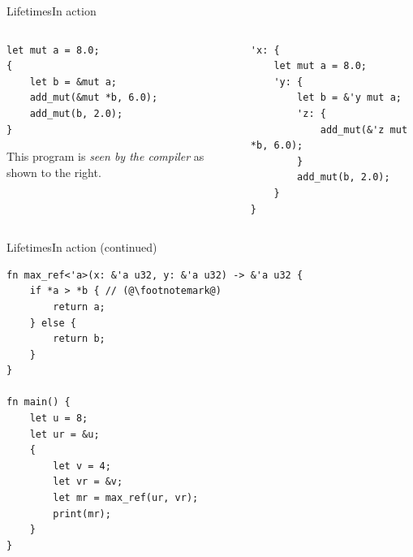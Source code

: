 \documentclass[xcolor=x11names,compress]{beamer}
\renewcommand{\(}{\begin{columns}}
\renewcommand{\)}{\end{columns}}
\newcommand{\<}[1]{\begin{column}{#1}}
\renewcommand{\>}{\end{column}}
\begin{document}
\begin{frame}[fragile]{Lifetimes}{In action}
\begin{columns}[T]
\begin{column}{.40\textwidth}
\begin{lstlisting}[basicstyle=\footnotesize\ttfamily,numbers=none]
let mut a = 8.0;
{
    let b = &mut a;
    add_mut(&mut *b, 6.0);
    add_mut(b, 2.0);
}
\end{lstlisting}
This program is \textit{seen by the compiler} as shown to the right.
\end{column}
\hfill
\begin{column}{.56\textwidth}
\begin{lstlisting}[basicstyle=\footnotesize\ttfamily,numbers=none]
'x: {
    let mut a = 8.0;
    'y: {
        let b = &'y mut a;
        'z: {
            add_mut(&'z mut *b, 6.0);
        }
        add_mut(b, 2.0);
    }
}
\end{lstlisting}
\end{column}
\end{columns}
\end{frame}

\begin{frame}[fragile]{Lifetimes}{In action (continued)}
\begin{lstlisting}[basicstyle=\footnotesize\ttfamily]
fn max_ref<'a>(x: &'a u32, y: &'a u32) -> &'a u32 {
    if *a > *b { // (@\footnotemark@)
        return a;
    } else {
        return b;
    }
}

fn main() {
    let u = 8;
    let ur = &u;
    {
        let v = 4;
        let vr = &v;
        let mr = max_ref(ur, vr);
        print(mr);
    }
}
\end{lstlisting}
\end{frame}
\end{document}
